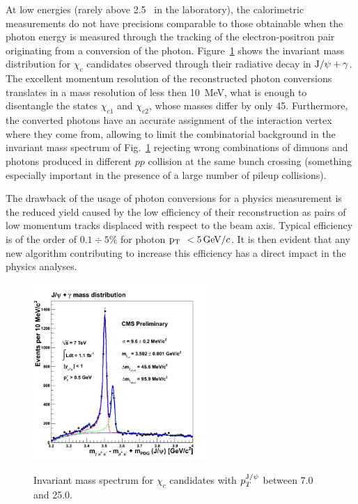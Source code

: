 \documentclass[a4paper]{jpconf}
\def \Chione {\chi_{c1}}
\def \Chitwo {\chi_{c2}}
\def \JPsi{\rm J/\psi}
\def \cPgg{\gamma}
\def \pt{$\p_{\rm T}$~}
\begin{document}
At  low energies (rarely above 
2.5\GeV~ in the laboratory), the calorimetric
measurements do not have precisions comparable to those obtainable
when the photon energy is measured through the tracking of the 
electron-positron pair originating from a conversion of the photon.
Figure~\ref{fig:chic} shows the invariant mass distribution for $\chi_c$ candidates
observed through their radiative decay in $\JPsi + \cPgg$. The excellent momentum resolution of the reconstructed photon conversions translates in a mass resolution of less then 10~MeV, what is enough to disentangle  the states $\Chione$ and $\Chitwo$, whose masses differ by only 45\MeV.
%
Furthermore, the  converted photons have an accurate assignment of the interaction vertex where they come from, allowing  to limit the combinatorial background in the invariant mass spectrum of Fig.~\ref{fig:chic}
rejecting wrong combinations of  dimuons  and photons produced in different $pp$ collision at the same bunch crossing (something especially important in the
presence of a large number of pileup collisions). 


The drawback of the usage of photon conversions for a physics measurement 
is the reduced yield caused by the low efficiency of their reconstruction as pairs of low momentum tracks displaced with respect to the beam axis. Typical efficiency is of the order of $0.1 \div 5\%$ for photon \pt  $< 5 {\rm \, GeV}/c$. It is then evident that any new algorithm contributing to increase this efficiency has a direct impact in the physics analyses.





\begin{figure}[h]
    \centering
    \includegraphics[width=0.6\textwidth]{fig/Chic1fb.png}
    \label{fig:chic}
   \caption{Invariant mass spectrum for $\chi_c$ candidates with $p_T^{\JPsi}$ between 7.0 and 25.0\GeVc.}
\end{figure} 
\end{document}
